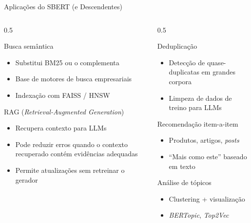 \documentclass[aspectratio=169, xcolor=dvipsnames]{beamer}
\begin{document}
  \begin{frame}{Aplicações do SBERT (e Descendentes)}
    \begin{columns}[T]
      \begin{column}{0.5\textwidth}
        \begin{block}{Busca semântica}
          \begin{itemize}
            \item Substitui BM25 ou o complementa
            \item Base de motores de busca empresariais
            \item Indexação com FAISS / HNSW
          \end{itemize}
        \end{block}
        \begin{block}{RAG (\textit{Retrieval-Augmented Generation})}
          \begin{itemize}
            \item Recupera contexto para LLMs
            \item Pode reduzir erros quando o contexto recuperado contém evidências adequadas
            \item Permite atualizações sem retreinar o gerador
          \end{itemize}
        \end{block}
      \end{column}
      \begin{column}{0.5\textwidth}
        \begin{block}{Deduplicação}
          \begin{itemize}
            \item Detecção de quase-duplicatas em grandes corpora
            \item Limpeza de dados de treino para LLMs
          \end{itemize}
        \end{block}
        \begin{block}{Recomendação item-a-item}
          \begin{itemize}
            \item Produtos, artigos, \textit{posts}
            \item ``Mais como este'' baseado em texto
          \end{itemize}
        \end{block}
        \begin{block}{Análise de tópicos}
          \begin{itemize}
            \item Clustering + visualização
            \item \textit{BERTopic}, \textit{Top2Vec}
          \end{itemize}
        \end{block}
      \end{column}
    \end{columns}
  \end{frame}
\end{document}
